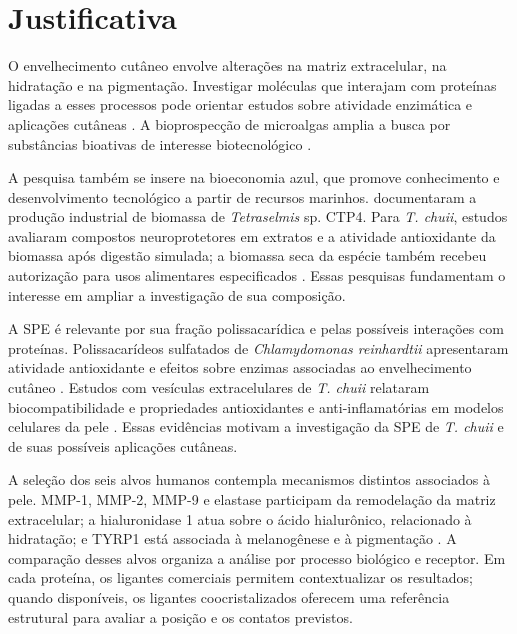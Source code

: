\section{Justificativa}
O envelhecimento cutâneo envolve alterações na matriz extracelular, na hidratação e na pigmentação. Investigar moléculas que interajam com proteínas ligadas a esses processos pode orientar estudos sobre atividade enzimática e aplicações cutâneas \parencite{liu2023,papaccio2022}. A bioprospecção de microalgas amplia a busca por substâncias bioativas de interesse biotecnológico \parencite{khemiri2023}.

A pesquisa também se insere na bioeconomia azul, que promove conhecimento e desenvolvimento tecnológico a partir de recursos marinhos. \textcite{pereira2019} documentaram a produção industrial de biomassa de \textit{Tetraselmis} sp. CTP4. Para \textit{T. chuii}, estudos avaliaram compostos neuroprotetores em extratos e a atividade antioxidante da biomassa após digestão simulada; a biomassa seca da espécie também recebeu autorização para usos alimentares especificados \parencite{cokdinleyen2024,moon2023,aecosan2014tetraselmis}. Essas pesquisas fundamentam o interesse em ampliar a investigação de sua composição.

A SPE é relevante por sua fração polissacarídica e pelas possíveis interações com proteínas. Polissacarídeos sulfatados de \textit{Chlamydomonas reinhardtii} apresentaram atividade antioxidante e efeitos sobre enzimas associadas ao envelhecimento cutâneo \parencite{falcao2020}. Estudos com vesículas extracelulares de \textit{T. chuii} relataram biocompatibilidade e propriedades antioxidantes e anti-inflamatórias em modelos celulares da pele \parencite{adamo2024,gargano2026}. Essas evidências motivam a investigação da SPE de \textit{T. chuii} e de suas possíveis aplicações cutâneas.

A seleção dos seis alvos humanos contempla mecanismos distintos associados à pele. MMP-1, MMP-2, MMP-9 e elastase participam da remodelação da matriz extracelular; a hialuronidase 1 atua sobre o ácido hialurônico, relacionado à hidratação; e TYRP1 está associada à melanogênese e à pigmentação \parencite{chao2007,lai2017,liu2025,macdonald2002}. A comparação desses alvos organiza a análise por processo biológico e receptor. Em cada proteína, os ligantes comerciais permitem contextualizar os resultados; quando disponíveis, os ligantes coocristalizados oferecem uma referência estrutural para avaliar a posição e os contatos previstos.

